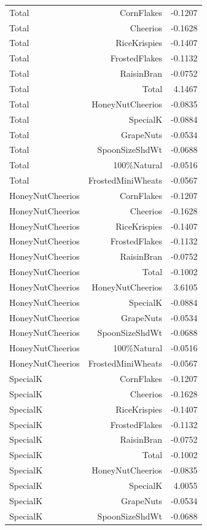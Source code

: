 \begin{longtable}{@{}lrr@{}}
Total & CornFlakes & -0.1207 \\
Total & Cheerios & -0.1628 \\
Total & RiceKrispies & -0.1407 \\
Total & FrostedFlakes & -0.1132 \\
Total & RaisinBran & -0.0752 \\
Total & Total & 4.1467 \\
Total & HoneyNutCheerios & -0.0835 \\
Total & SpecialK & -0.0884 \\
Total & GrapeNuts & -0.0534 \\
Total & SpoonSizeShdWt & -0.0688 \\
Total & 100\%Natural & -0.0516 \\
Total & FrostedMiniWheats & -0.0567 \\
HoneyNutCheerios & CornFlakes & -0.1207 \\
HoneyNutCheerios & Cheerios & -0.1628 \\
HoneyNutCheerios & RiceKrispies & -0.1407 \\
HoneyNutCheerios & FrostedFlakes & -0.1132 \\
HoneyNutCheerios & RaisinBran & -0.0752 \\
HoneyNutCheerios & Total & -0.1002 \\
HoneyNutCheerios & HoneyNutCheerios & 3.6105 \\
HoneyNutCheerios & SpecialK & -0.0884 \\
HoneyNutCheerios & GrapeNuts & -0.0534 \\
HoneyNutCheerios & SpoonSizeShdWt & -0.0688 \\
HoneyNutCheerios & 100\%Natural & -0.0516 \\
HoneyNutCheerios & FrostedMiniWheats & -0.0567 \\
SpecialK & CornFlakes & -0.1207 \\
SpecialK & Cheerios & -0.1628 \\
SpecialK & RiceKrispies & -0.1407 \\
SpecialK & FrostedFlakes & -0.1132 \\
SpecialK & RaisinBran & -0.0752 \\
SpecialK & Total & -0.1002 \\
SpecialK & HoneyNutCheerios & -0.0835 \\
SpecialK & SpecialK & 4.0055 \\
SpecialK & GrapeNuts & -0.0534 \\
SpecialK & SpoonSizeShdWt & -0.0688 \\

\end{longtable}
